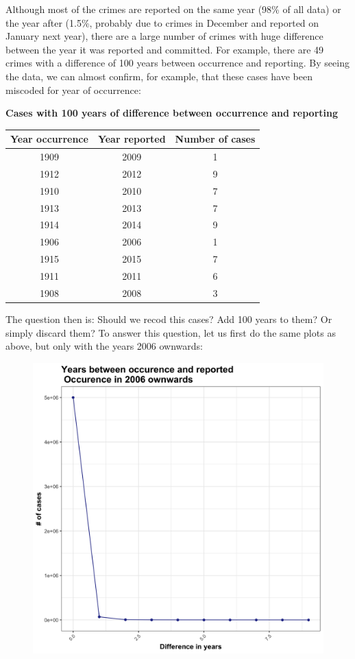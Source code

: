\documentclass{article}
\begin{document}
Although most of the crimes are reported on the same year (98\% of all data) or the year after (1.5\%, probably due to crimes in December and reported on January next year), there are a large number of crimes with huge difference between the year it was reported and committed. For example, there are 49 crimes with a difference of 100 years between occurrence and reporting. By seeing the data, we can almost confirm, for example, that these cases have been miscoded for year of occurrence: 

\begin{center}
\textbf{Cases with 100 years of difference between occurrence and reporting} \\
\begin{tabular}{ |c|c|c| } 
\hline
\textbf{Year occurrence} & \textbf{Year reported}  & \textbf{Number of cases} \\
\hline
   1909 & 2009 & 1 \\ 
   1912 & 2012 & 9 \\ 
   1910 & 2010 & 7 \\  
   1913 & 2013 & 7 \\  
   1914 & 2014 & 9 \\ 
   1906 & 2006 & 1 \\ 
   1915 & 2015 & 7 \\ 
   1911 & 2011 & 6\\ 
   1908 & 2008 & 3 \\ 
\hline
\end{tabular}
\end{center}

The question then is: Should we recod this cases? Add 100 years to them? Or simply discard them? To answer this question, let us first do the same plots as above, but only with the years 2006 ownwards: 

\begin{figure}[H]
\centering
\includegraphics[scale=0.14]{10_DiffYears_2006.png}
\end{figure}
\end{document}
